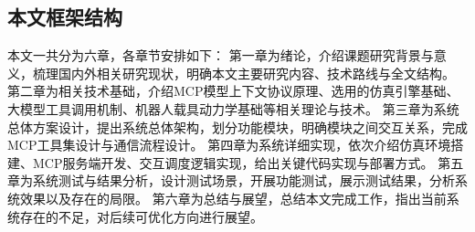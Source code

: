 \subsection{本文框架结构}
本文一共分为六章，各章节安排如下：
第一章为绪论，介绍课题研究背景与意义，梳理国内外相关研究现状，明确本文主要研究内容、技术路线与全文结构。
第二章为相关技术基础，介绍MCP模型上下文协议原理、选用的仿真引擎基础、大模型工具调用机制、机器人载具动力学基础等相关理论与技术。
第三章为系统总体方案设计，提出系统总体架构，划分功能模块，明确模块之间交互关系，完成MCP工具集设计与通信流程设计。
第四章为系统详细实现，依次介绍仿真环境搭建、MCP服务端开发、交互调度逻辑实现，给出关键代码实现与部署方式。
第五章为系统测试与结果分析，设计测试场景，开展功能测试，展示测试结果，分析系统效果以及存在的局限。
第六章为总结与展望，总结本文完成工作，指出当前系统存在的不足，对后续可优化方向进行展望。
